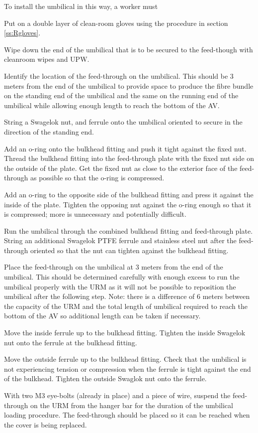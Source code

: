 \documentclass[11pt]{article}
\begin{document}
To install the umbilical in this way, a worker must
\begin{answerlist}
\item Put on a double layer of clean-room gloves using the procedure in section \ref{ss:Rgloves}.
\item Wipe down the end of the umbilical that is to be secured to the
  feed-though with cleanroom wipes and UPW. 
\item Identify the location of the feed-through on the umbilical. This
  should be 3 meters from the end of the umbilical to provide space to
  produce the fibre bundle on the standing end of the umbilical and
  the same on the running end of the umbilical while allowing enough
  length to reach the bottom of the AV.
\item String a Swagelok nut, and ferrule onto the umbilical oriented
  to secure in the direction of the standing end.
\item Add an o-ring onto the bulkhead fitting and push it tight
  against the fixed nut. Thread the bulkhead fitting into the
  feed-through plate with the fixed nut side on the outside of the
  plate. Get the fixed nut as close to the exterior face of the
  feed-through as possible so that the o-ring is compressed.
\item Add an o-ring to the opposite side of the bulkhead fitting and
  press it against the inside of the plate. Tighten the opposing nut
  against the o-ring enough so that it is compressed; more is
  unnecessary and potentially difficult.
\item Run the umbilical through the combined bulkhead fitting and
  feed-through plate. String an additional Swagelok PTFE ferrule and
  stainless steel nut after the feed-through oriented so that the nut
  can tighten against the bulkhead fitting.
\item Place the feed-through on the umbilical at 3 meters from the end
  of the umbilical. This should be determined carefully with enough
  excess to run the umbilical properly with the URM as it will not be
  possible to reposition the umbilical after the following step. Note:
  there is a difference of 6 meters between the capacity of the URM
  and the total length of umbilical required to reach the bottom of
  the AV so additional length can be taken if necessary.
\item Move the inside ferrule up to the bulkhead fitting. Tighten the
  inside Swagelok nut onto the ferrule at the bulkhead fitting.
\item Move the outside ferrule up to the bulkhead fitting. Check that
  the umbilical is not experiencing tension or compression when the
  ferrule is tight against the end of the bulkhead. Tighten the
  outside Swaglok nut onto the ferrule.
\item With two M3 eye-bolts (already in place) and a piece of wire,
  suspend the feed-through on the URM from the hanger bar for the
  duration of the umbilical loading procedure. The feed-through should
  be placed so it can be reached when the cover is being replaced.
\end{answerlist}
\end{document}
